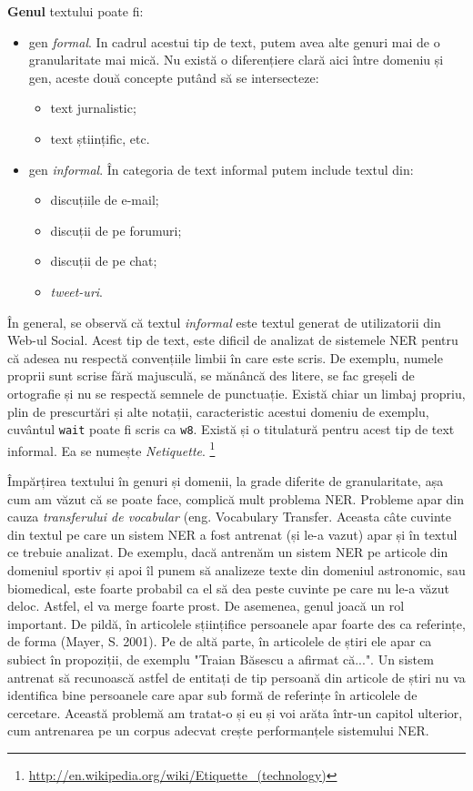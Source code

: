 \textbf{Genul} textului poate fi:

\begin{itemize}
	\item gen \textit{formal}. In cadrul acestui tip de text, putem avea alte genuri mai de o granularitate mai mică.  Nu există o diferențiere clară aici între domeniu și gen, aceste două concepte putând să se intersecteze:
	\begin{itemize}
		\item text jurnalistic;
		\item text științific, etc.
	\end{itemize}
	\item gen \textit{informal}. În categoria de text informal putem include textul din:
	\begin{itemize}
		\item discuțiile de e-mail;
		\item discuții de pe forumuri;
		\item discuții de pe chat;
		\item \textit{tweet-uri}.
	\end{itemize}
\end{itemize}

În general, se observă că textul \textit{informal} este textul generat de utilizatorii din Web-ul Social. Acest tip de text, este dificil de analizat de sistemele NER pentru că adesea nu respectă convențiile limbii în care este scris. De exemplu, numele proprii sunt scrise fără majusculă, se mănâncă des litere, se fac greșeli de ortografie și nu se respectă semnele de punctuație. Există chiar un limbaj propriu, plin de prescurtări și alte notații, caracteristic acestui domeniu de exemplu, cuvântul \texttt{wait} poate fi scris ca \texttt{w8}. Există și o titulatură pentru acest tip de text informal. Ea se numește \textit{Netiquette}. \footnote{\url{http://en.wikipedia.org/wiki/Etiquette_(technology)}}

Împărțirea textului în genuri și domenii, la grade diferite de granularitate, așa cum am văzut că se poate face, complică mult problema NER. Probleme apar din cauza \textit{transferului de vocabular} (eng. Vocabulary Transfer. Aceasta câte cuvinte din textul pe care un sistem NER a fost antrenat (și le-a vazut) apar și în textul ce trebuie analizat. De exemplu, dacă antrenăm un sistem NER pe articole din domeniul sportiv și apoi îl punem să analizeze texte din domeniul astronomic, sau biomedical, este foarte probabil ca el să dea peste cuvinte pe care nu le-a văzut deloc. Astfel, el va merge foarte prost. De asemenea, genul joacă un rol important. De pildă, în articolele sțiințifice persoanele apar foarte des ca referințe, de forma (Mayer, S. 2001). Pe de altă parte, în articolele de știri ele apar ca subiect în propoziții, de exemplu "Traian Băsescu a afirmat că...". Un sistem antrenat să recunoască astfel de entitați de tip persoană din articole de știri nu va identifica bine persoanele care apar sub formă de referințe în articolele de cercetare. Această problemă am tratat-o și eu și voi arăta într-un capitol ulterior, cum antrenarea pe un corpus adecvat crește performanțele sistemului NER.


